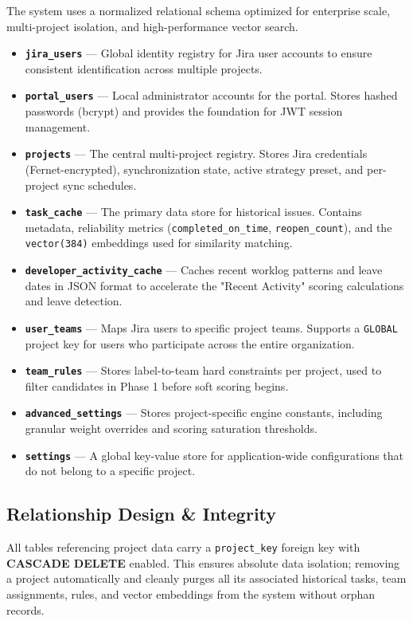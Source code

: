 \documentclass[12pt, a4paper]{article}
\begin{document}
The system uses a normalized relational schema optimized for enterprise scale, multi-project isolation, and high-performance vector search.

\begin{itemize}
    \item \textbf{\texttt{jira\_users}} — Global identity registry for Jira user accounts to ensure consistent identification across multiple projects.
    \item \textbf{\texttt{portal\_users}} — Local administrator accounts for the portal. Stores hashed passwords (bcrypt) and provides the foundation for JWT session management.
    \item \textbf{\texttt{projects}} — The central multi-project registry. Stores Jira credentials (Fernet-encrypted), synchronization state, active strategy preset, and per-project sync schedules.
    \item \textbf{\texttt{task\_cache}} — The primary data store for historical issues. Contains metadata, reliability metrics (\texttt{completed\_on\_time}, \texttt{reopen\_count}), and the \texttt{vector(384)} embeddings used for similarity matching.
    \item \textbf{\texttt{developer\_activity\_cache}} — Caches recent worklog patterns and leave dates in JSON format to accelerate the "Recent Activity" scoring calculations and leave detection.
    \item \textbf{\texttt{user\_teams}} — Maps Jira users to specific project teams. Supports a \texttt{GLOBAL} project key for users who participate across the entire organization.
    \item \textbf{\texttt{team\_rules}} — Stores label-to-team hard constraints per project, used to filter candidates in Phase 1 before soft scoring begins.
    \item \textbf{\texttt{advanced\_settings}} — Stores project-specific engine constants, including granular weight overrides and scoring saturation thresholds.
    \item \textbf{\texttt{settings}} — A global key-value store for application-wide configurations that do not belong to a specific project.
\end{itemize}

\subsection{Relationship Design \& Integrity}

All tables referencing project data carry a \texttt{project\_key} foreign key with \textbf{CASCADE DELETE} enabled. This ensures absolute data isolation; removing a project automatically and cleanly purges all its associated historical tasks, team assignments, rules, and vector embeddings from the system without orphan records.
\end{document}
